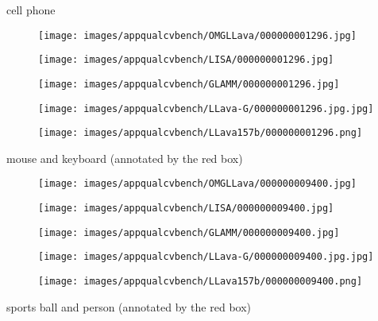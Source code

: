 \begin{figure*}[t]
\centering

cell phone

\begin{subfigure}{0.19\textwidth}
\texttt{[image: images/appqualcvbench/OMGLLava/000000001296.jpg]}
\end{subfigure}%
\begin{subfigure}{0.19\textwidth}
\texttt{[image: images/appqualcvbench/LISA/000000001296.jpg]}
\end{subfigure}%
\begin{subfigure}{0.19\textwidth}
\texttt{[image: images/appqualcvbench/GLAMM/000000001296.jpg]}
\end{subfigure}%
\begin{subfigure}{0.19\textwidth}
\texttt{[image: images/appqualcvbench/LLava-G/000000001296.jpg.jpg]}
\end{subfigure}%
\begin{subfigure}{0.19\textwidth}
\texttt{[image: images/appqualcvbench/LLava157b/000000001296.png]}
\end{subfigure}

mouse and keyboard (annotated by the red box)

\begin{subfigure}{0.19\textwidth}
\texttt{[image: images/appqualcvbench/OMGLLava/000000009400.jpg]}
\end{subfigure}%
\begin{subfigure}{0.19\textwidth}
\texttt{[image: images/appqualcvbench/LISA/000000009400.jpg]}
\end{subfigure}%
\begin{subfigure}{0.19\textwidth}
\texttt{[image: images/appqualcvbench/GLAMM/000000009400.jpg]}
\end{subfigure}%
\begin{subfigure}{0.19\textwidth}
\texttt{[image: images/appqualcvbench/LLava-G/000000009400.jpg.jpg]}
\end{subfigure}%
\begin{subfigure}{0.19\textwidth}
\texttt{[image: images/appqualcvbench/LLava157b/000000009400.png]}
\end{subfigure}

sports ball and person (annotated by the red box)


\end{figure*}
